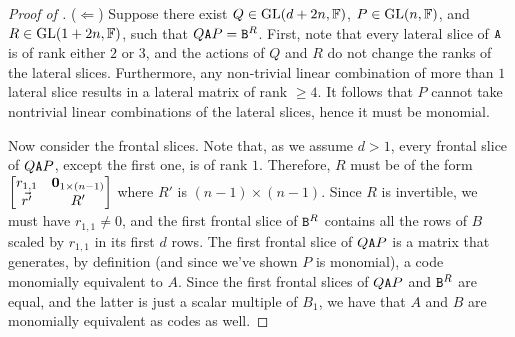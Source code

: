 \begin{proof}[Proof of ]
($\Leftarrow$) 
Suppose there exist $Q\in \mathrm{GL}(d+2n, \mathbb{F})$, $P\in \mathrm{GL}(n, \mathbb{F})$, 
and $R\in \mathrm{GL}(1+2n, \mathbb{F})$, such that $Q\mathtt{A} P =\mathtt{B}^R$. 
First, note that every
lateral slice of $\mathtt{A}$ is of rank either $2$ or $3$, 
and the actions of $Q$ and $R$ do 
not change the ranks of the lateral slices.
Furthermore, any non-trivial linear 
combination of more than $1$ lateral slice results in a lateral matrix of rank 
$\geq 4$. It follows that $P$ cannot take nontrivial linear combinations of the lateral slices, hence it must be monomial. 

Now consider the frontal 
slices. Note that, as we assume $d>1$, every frontal slice of $Q\mathtt{A} P$, except the 
first one, is of 
rank $1$. Therefore, $R$ must be of the form 
$\begin{bmatrix} r_{1,1} & \mathbf{0}_{1 \times (n-1)} \\ \vec{r'} & R' \end{bmatrix}$ 
where $R'$ is $(n-1) \times (n-1)$. Since $R$ is invertible, we must have $r_{1,1}\neq 0$, and the first frontal slice of $\mathtt{B}^R$ 
contains all the rows of $B$ scaled by $r_{1,1}$ in its first $d$ rows. The first frontal slice of $Q\mathtt{A} P$ is a matrix that generates, by definition (and since we've shown $P$ is monomial), a code monomially equivalent to $A$. Since the first frontal slices of $Q \mathtt{A} P$ and $\mathtt{B}^R$ are equal, and the latter is just a scalar multiple of $B_1$, we have that $A$ and $B$ are monomially equivalent as codes as well.
\end{proof}

